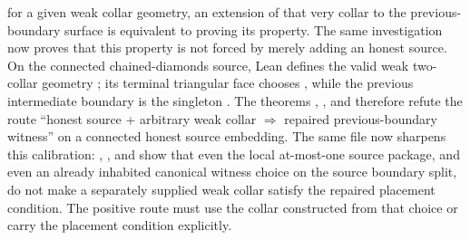 \documentclass[11pt]{article}
\begin{document}
for a given weak collar geometry, an extension of that very collar to the
previous-boundary surface is equivalent to proving its
 property.  The same investigation now proves
that this property is not forced by merely adding an honest source.  On the
connected chained-diamonds source, Lean defines the valid weak two-collar
geometry ; its terminal triangular
face chooses , while the previous intermediate boundary is
the singleton .  The theorems
,
,
and
therefore refute the route ``honest source + arbitrary weak collar
\(\Rightarrow\) repaired previous-boundary witness'' on a connected honest
source embedding.  The same file now sharpens this calibration:
,
,
and
show that even the local at-most-one source package, and even an already
inhabited canonical witness choice on the source boundary split, do not make a
separately supplied weak collar satisfy the repaired placement condition.  The
positive route must use the collar constructed from that choice or carry the
placement condition explicitly.
\end{document}
